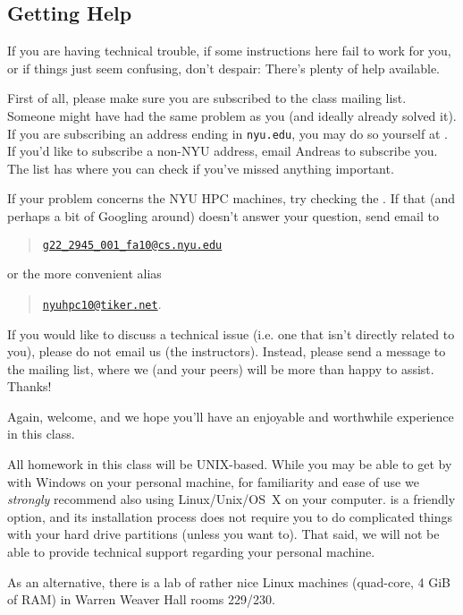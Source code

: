 \documentclass[11pt]{article}
\begin{document}



\clearpage


\subsection*{Getting Help}

If you are having technical trouble, if some instructions here fail to
work for you, or if things just seem confusing, don't despair: There's
plenty of help available.

First of all, please make sure you are subscribed to the class mailing
list. Someone might have had the same problem as you (and ideally
already solved it).  If you are subscribing an address ending in
\texttt{nyu.edu}, you may do so yourself at
. If you'd like to subscribe a non-NYU address, email
Andreas to subscribe you. The list has
where you can check if you've missed anything important.

If your problem concerns the NYU HPC machines, try checking the
.
If that (and perhaps a bit of Googling around) doesn't answer your
question, send email to
\begin{quote}
  \href{mailto:g22\_2945\_001\_fa10@cs.nyu.edu}{\texttt{g22\_2945\_001\_fa10@cs.nyu.edu}}
\end{quote}
or the more convenient alias
\begin{quote}
  \href{mailto:nyuhpc10@tiker.net}{\texttt{nyuhpc10@tiker.net}}.
\end{quote}

If you would like to discuss a technical issue (i.e. one that isn't
directly related to you), please do not email us (the instructors).
Instead, please send a message to the mailing list, where we (and your
peers) will be more than happy to assist.  Thanks!

Again, welcome, and we hope you'll have an enjoyable and worthwhile
experience in this class.

\begin{note}
All homework in this class will be UNIX-based. While you
may be able to get by with Windows on your personal machine, for
familiarity and ease of use we \emph{strongly} recommend also using
Linux/Unix/OS~X on your computer.
 is a friendly option, and its
installation process does not require you to do complicated things
with your hard drive partitions (unless you want to). That said, we
will not be able to provide technical support regarding your personal
machine.

As an alternative, there is a lab of rather nice Linux machines
(quad-core, 4 GiB of RAM) in Warren Weaver Hall rooms 229/230.
\end{note}
\end{document}

